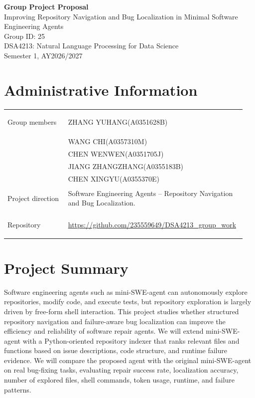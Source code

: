 \documentclass[11pt]{article}
\newcommand{\course}{DSA4213: Natural Language Processing for Data Science}
\newcommand{\semester}{Semester 1, AY2026/2027}
\begin{document}
\begin{center}
{\LARGE\bfseries Group Project Proposal}\\[0.4em]
{\large Improving Repository Navigation and Bug Localization in Minimal Software Engineering Agents}\\[0.9em]
Group ID: 25\\[0.9em]
\course\\
\semester
\end{center}

\section*{Administrative Information}

\begin{tabular}{@{}>{\bfseries\raggedright\arraybackslash}p{0.25\linewidth}
                    >{\raggedright\arraybackslash}p{0.70\linewidth}@{}}
Group members & ZHANG YUHANG(A0351628B) \\ &WANG CHI(A0357310M)  \\ &CHEN WENWEN(A0351705J) \\ &JIANG ZHANGZHANG(A0355183B)\\&CHEN XINGYU(A0355370E) \\[0.7em]

Project direction & Software Engineering Agents -- Repository Navigation and Bug Localization. \\[0.7em]
Repository & \url{https://github.com/235559649/DSA4213_group_work} \\
\end{tabular}

\section*{Project Summary}

Software engineering agents such as mini-SWE-agent can autonomously explore repositories, modify code, and execute tests, but repository exploration is largely driven by free-form shell interaction. This project studies whether structured repository navigation and failure-aware bug localization can improve the efficiency and reliability of software repair agents. We will extend mini-SWE-agent with a Python-oriented repository indexer that ranks relevant files and functions based on issue descriptions, code structure, and runtime failure evidence. We will compare the proposed agent with the original mini-SWE-agent on real bug-fixing tasks, evaluating repair success rate, localization accuracy, number of explored files, shell commands, token usage, runtime, and failure patterns.
\end{document}

